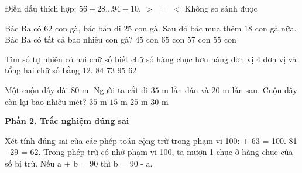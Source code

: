 \begin{ex} %
Điền dấu thích hợp: $56 + 28 \dots 94 - 10$.
\choice
{$>$}
{\True $=$}
{$<$}
{Không so sánh được}
\end{ex}

\begin{ex} %
Bác Ba có $62$ con gà, bác bán đi $25$ con gà. Sau đó bác mua thêm $18$ con gà nữa. Bác Ba có tất cả bao nhiêu con gà?
\choice
{$45$ con}
{$65$ con}
{$57$ con}
{\True $55$ con}
\end{ex}

\begin{ex} %
Tìm số tự nhiên có hai chữ số biết chữ số hàng chục hơn hàng đơn vị 4 đơn vị và tổng hai chữ số bằng 12.
\choice
{\True $84$}
{$73$}
{$95$}
{$62$}
\end{ex}

\begin{ex} %
Một cuộn dây dài $80\text{ m}$. Người ta cắt đi $35\text{ m}$ lần đầu và $20\text{ m}$ lần sau. Cuộn dây còn lại bao nhiêu mét?
\choice
{$35\text{ m}$}
{$15\text{ m}$}
{\True $25\text{ m}$}
{$30\text{ m}$}
\end{ex}

\textbf{Phần 2. Trắc nghiệm đúng sai}

\begin{ex} %
Xét tính đúng sai của các phép toán cộng trừ trong phạm vi 100:
\choiceTF
{ + 63 = 100.}
{81 - 29 = 62.}
{\True Trong phép trừ có nhớ phạm vi 100, ta mượn 1 chục ở hàng chục của số bị trừ.}
{\True Nếu a + b = 90 thì b = 90 - a.}
\end{ex}


